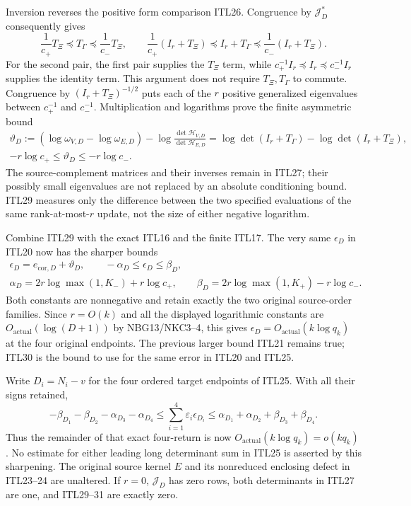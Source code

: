 \documentclass[11pt,a4paper]{article}
\begin{document}
Inversion reverses the positive form comparison ITL26.
Congruence by $\mathcal J_D^*$ consequently gives
\[
 \frac1{c_+}T_\Xi\preceq T_\Gamma
              \preceq\frac1{c_-}T_\Xi,\qquad
 \frac1{c_+}(I_r+T_\Xi)\preceq I_r+T_\Gamma
              \preceq\frac1{c_-}(I_r+T_\Xi).        \tag{ITL28}
\]
For the second pair, the first pair supplies the $T_\Xi$
term, while $c_+^{-1}I_r\preceq I_r\preceq c_-^{-1}I_r$
supplies the identity term. This argument does not require
$T_\Xi,T_\Gamma$ to commute. Congruence by
$(I_r+T_\Xi)^{-1/2}$ puts each of the $r$ positive
generalized eigenvalues between $c_+^{-1}$ and $c_-^{-1}$.
Multiplication and logarithms prove the finite asymmetric bound
\[
 \begin{gathered}
 \vartheta_D:=(\log\omega_{V,D}-\log\omega_{E,D})
       -\log\frac{\det\mathcal H_{V,D}}{\det\mathcal H_{E,D}}
       =\log\det(I_r+T_\Gamma)-\log\det(I_r+T_\Xi),\\
           -r\log c_+\le\vartheta_D\le-r\log c_- .
 \end{gathered}                                      \tag{ITL29}
\]
The source-complement matrices and their inverses remain in
ITL27; their possibly small eigenvalues are not replaced by
an absolute conditioning bound. ITL29 measures only the
difference between the two specified evaluations of the same
rank-at-most-$r$ update, not the size of either negative logarithm.

Combine ITL29 with the exact ITL16 and the finite ITL17.
The very same $\epsilon_D$ in ITL20 now has the sharper bounds
\[
 \begin{gathered}
 \epsilon_D=e_{\mathrm{cor},D}+\vartheta_D,\qquad
             -\alpha_D\le\epsilon_D\le\beta_D,\\
 \alpha_D=2r\log\max(1,K_-)+r\log c_+,\qquad
 \beta_D=2r\log\max(1,K_+)-r\log c_- .
 \end{gathered}                                      \tag{ITL30}
\]
Both constants are nonnegative and retain exactly the two
original source-order families. Since $r=O(k)$ and all the
displayed logarithmic constants are
$O_{\mathrm{actual}}(\log(D+1))$ by NBG13/NKC3--4,
this gives $\epsilon_D=O_{\mathrm{actual}}(k\log q_k)$
at the four original endpoints. The previous larger bound
ITL21 remains true; ITL30 is the bound to use for the same
error in ITL20 and ITL25.

Write $D_i=N_i-v$ for the four ordered target endpoints
of ITL25. With all their signs retained,
\[
 -\beta_{D_1}-\beta_{D_2}-\alpha_{D_3}-\alpha_{D_4}
 \le\sum_{i=1}^4\varepsilon_i\epsilon_{D_i}
 \le\alpha_{D_1}+\alpha_{D_2}+\beta_{D_3}+\beta_{D_4}.
                                                        \tag{ITL31}
\]
Thus the remainder of that exact four-return is now
$O_{\mathrm{actual}}(k\log q_k)=o(kq_k)$.
No estimate for either leading long determinant sum in ITL25
is asserted by this sharpening. The original source kernel
$E$ and its nonreduced enclosing defect in ITL23--24 are
unaltered. If $r=0$, $\mathcal J_D$ has zero rows, both
determinants in ITL27 are one, and ITL29--31 are exactly zero.
\end{document}
